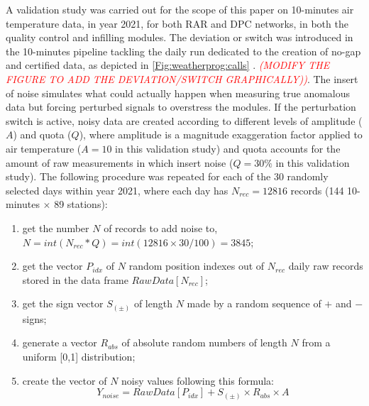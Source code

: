 \documentclass[authoryear,preprint,review,12pt]{elsarticle}
\newcommand{\note}[1]{\emph{\textcolor{red}{#1}}}
\begin{document}
A validation study was carried out for the scope of this paper on 10-minutes air temperature data, in year 2021, for both RAR and DPC networks, in both the quality control and infilling  modules.
The deviation or switch was introduced in the 10-minutes pipeline tackling the daily run dedicated to the creation of no-gap and certified data, as depicted in \cref{Fig:weatherprog:calls} . \note{(MODIFY THE FIGURE TO ADD THE DEVIATION/SWITCH GRAPHICALLY))}.
The insert of noise simulates what could actually happen when measuring true anomalous data but forcing perturbed signals to overstress the modules.
If the perturbation switch is active, noisy data are created according to different levels of amplitude ($A$) and quota ($Q$), where amplitude is a magnitude exaggeration factor applied to air temperature ($A=10$ in this validation study) and quota accounts for the amount of raw measurements in which insert noise ($Q=30\%$ in this validation study).
The following procedure was repeated for each of the 30 randomly selected days within year 2021, where each day has $N_{rec}=12816$ records (144 10-minutes $\times$ 89 stations):

\begin{enumerate}
    \item get the number $N$ of records to add noise to, $N = int( N_{rec} * Q ) = int(12816 \times 30 / 100) = 3845$;
    \item get the vector $P_{idx}$ of $N$ random position indexes out of $N_{rec}$ daily raw records stored in the data frame $RawData[N_{rec}]$;
    \item get the sign vector $S_{(\pm)}$ of length $N$ made by a random sequence of $+$ and $-$ signs;
    \item generate a vector $R_{abs}$ of absolute random numbers of length $N$ from a uniform [0,1] distribution;
    \item create the vector of $N$ noisy values following this formula:
    $$Y_{noise} = RawData[P_{idx}] + S_{(\pm)} \times R_{abs} \times A$$
\end{enumerate}
\end{document}

